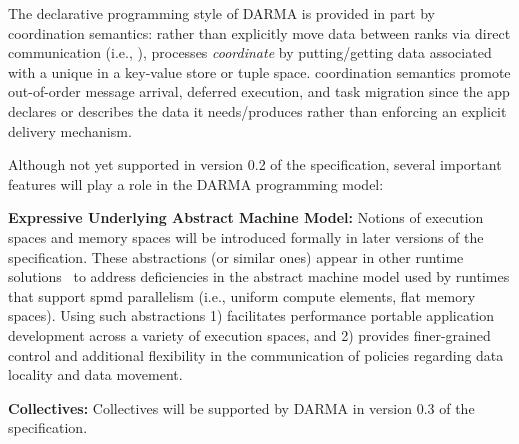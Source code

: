 The declarative programming style of DARMA is provided in part by \gls{coordination
semantics}:  rather than explicitly move data between ranks via direct communication
(i.e.,  ), processes \emph{coordinate} by putting/getting
data associated with a unique  in a
\gls{key-value store} or \gls{tuple space}.  
\Gls{coordination semantics} promote out-of-order message arrival, deferred execution, and task migration
since the app declares or describes the data it needs/produces rather than enforcing an explicit delivery mechanism.

Although not yet supported in version 0.2 of the specification, several
important features will play a role in the DARMA programming model:
\begin{compactdesc}
\item{\bf Expressive Underlying Abstract Machine Model:}
Notions of \glspl{execution space} and \glspl{memory space} will be introduced
formally in later
versions of the specification.  These abstractions (or similar ones) appear in other runtime
solutions~\cite{kokkos, others}  to
address deficiencies in the abstract machine model used by runtimes that
support \gls{spmd} parallelism (i.e., uniform compute elements, flat memory
    spaces).  Using such abstractions
1) facilitates performance portable application development across 
a variety of execution spaces, and 2)
  provides finer-grained control and additional flexibility in the
  communication of policies regarding data locality and data movement. 
\item{\bf Collectives:}
Collectives will be supported by DARMA in version 0.3 of the specification.
\end{compactdesc}
